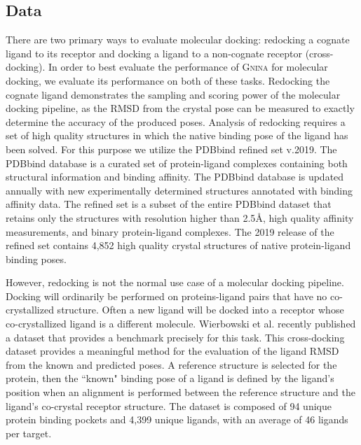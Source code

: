 \documentclass[linenumbers,doublespacing]{bmcart}
\begin{document}
\subsection{Data}
There are two primary ways to evaluate molecular docking: redocking a cognate ligand to its receptor and docking a ligand to a non-cognate receptor (cross-docking). In order to best evaluate the performance of \textsc{Gnina} for molecular docking, we evaluate its performance on both of these tasks. Redocking the cognate ligand demonstrates the sampling and scoring power of the molecular docking pipeline, as the RMSD from the crystal pose can be measured to exactly determine the accuracy of the produced poses. Analysis of redocking requires a set of high quality structures in which the native binding pose of the ligand has been solved. For this purpose we utilize the PDBbind refined set v.2019\cite{liu2017forging}. The PDBbind database is a curated set of protein-ligand complexes containing both structural information and binding affinity. The PDBbind database is updated annually with new experimentally determined structures annotated with binding affinity data. The refined set is a subset of the entire PDBbind dataset that retains only the structures with resolution higher than 2.5{\AA}, high quality affinity measurements, and binary protein-ligand complexes. The 2019 release of the refined set contains 4,852 high quality crystal structures of native protein-ligand binding poses. 

However, redocking is not the normal use case of a molecular docking pipeline. Docking will ordinarily be performed on proteins-ligand pairs that have no co-crystallized structure. Often a new ligand will be docked into a receptor whose co-crystallized ligand is a different molecule. Wierbowski et al.\cite{wierbowski2020cross} recently published a dataset that provides a benchmark precisely for this task. This cross-docking dataset provides a meaningful method for the evaluation of the ligand RMSD from the known and predicted poses. A reference structure is selected for the protein, then the ``known" binding pose of a ligand is defined by the ligand's position when an alignment is performed between the reference structure and the ligand's co-crystal receptor structure. The dataset is composed of 94 unique protein binding pockets and 4,399 unique ligands, with an average of 46 ligands per target.
\end{document}
